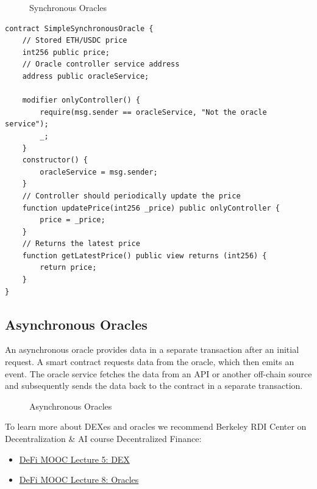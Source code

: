 \documentclass[12pt]{article}
\begin{document}
\begin{figure}[h!]
  \caption{Synchronous Oracles}
  \label{fig:synchronous-oracles}
\end{figure}

\begin{lstlisting}[language=Solidity]
  contract SimpleSynchronousOracle {
    // Stored ETH/USDC price
    int256 public price;
    // Oracle controller service address
    address public oracleService;
    
    modifier onlyController() {
        require(msg.sender == oracleService, "Not the oracle service");
        _;
    }
    constructor() {
        oracleService = msg.sender;
    }
    // Controller should periodically update the price
    function updatePrice(int256 _price) public onlyController {
        price = _price;
    }
    // Returns the latest price
    function getLatestPrice() public view returns (int256) {
        return price;
    }
}
\end{lstlisting}

\subsection*{Asynchronous Oracles}

An asynchronous oracle provides data in a separate transaction after an initial request. A smart contract requests data from the oracle, which then emits an event. The oracle service fetches the data from an API or another off-chain source and subsequently sends the data back to the contract in a separate transaction.

\begin{figure}[h!]
  \caption{Asynchronous Oracles}
  \label{fig:asynchronous-oracles}
\end{figure}

To learn more about DEXes and oracles we recommend Berkeley RDI Center on Decentralization \& AI course Decentralized Finance:
\begin{itemize}
\item \href{https://www.youtube.com/playlist?list=PLS01nW3RtgopoR-FHiMwfoMLT-opXlfJF}{DeFi MOOC Lecture 5: DEX}
\item \href{https://www.youtube.com/playlist?list=PLS01nW3Rtgoo70DT2YsBmNUol4134S9C9}{DeFi MOOC Lecture 8: Oracles}
\end{itemize}
\end{document}

